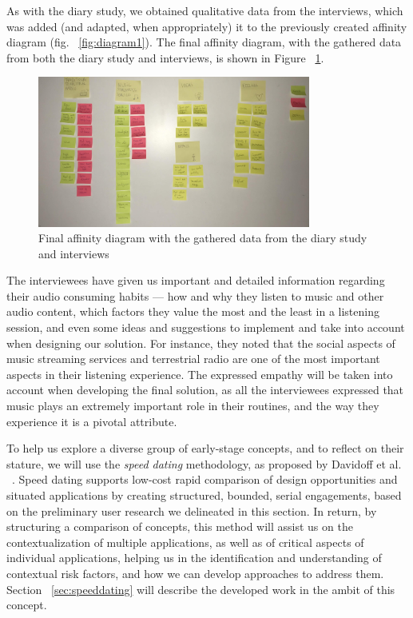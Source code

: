 As with the diary study, we obtained qualitative data from the interviews, which was added (and adapted, when appropriately) it to the previously created affinity diagram (fig. ~\ref{fig:diagram1}). The final affinity diagram, with the gathered data from both the diary study and interviews, is shown in Figure ~\ref{fig:diagram2}.

\begin{figure}[h]
\centering
\includegraphics[width=0.8\textwidth]{./Images/finalaffinitydiagram.jpg}
\caption{Final affinity diagram with the gathered data from the diary study and interviews}
\label{fig:diagram2}
\end{figure}

The interviewees have given us important and detailed information regarding their audio consuming habits — how and why they listen to music and other audio content, which factors they value the most and the least in a listening session, and even some ideas and suggestions to implement and take into account when designing our solution. For instance, they noted that the social aspects of music streaming services and terrestrial radio are one of the most important aspects in their listening experience. The expressed empathy will be taken into account when developing the final solution, as all the interviewees expressed that music plays an extremely important role in their routines, and the way they experience it is a pivotal attribute.

To help us explore a diverse group of early-stage concepts, and to reflect on their stature, we will use the \textit{speed dating} methodology, as proposed by Davidoff et al. ~\cite{Davidoff2007}. Speed dating supports low-cost rapid comparison of design opportunities and situated applications by creating structured, bounded, serial engagements, based on the preliminary user research we delineated in this section. In return, by structuring a comparison of concepts, this method will assist us on the contextualization of multiple applications, as well as of critical aspects of individual applications, helping us in the identification and understanding of contextual risk factors, and how we can develop approaches to address them. Section ~\ref{sec:speeddating} will describe the developed work in the ambit of this concept.